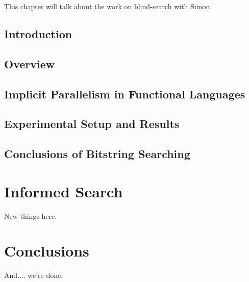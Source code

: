 \documentclass[justified]{tufte-book}
\begin{document}
    This chapter will talk about the work on blind-search with Simon.

    \section{Introduction}
    

    \section{Overview}
    \label{sec:blind-Overview}
    

    \section{Implicit Parallelism in Functional Languages}
    \label{sec:blind-ParFunc}
    

    \section{Experimental Setup and Results}
    \label{sec:blind-Results}
    

    \section{Conclusions of Bitstring Searching}
    \label{sec:blind-Conclusion}
    

\chapter{Informed Search}

    New things here.
    \label{sec:informed-search}
    

\chapter{Conclusions}

    And.... we're done.

\backmatter



\end{document}
